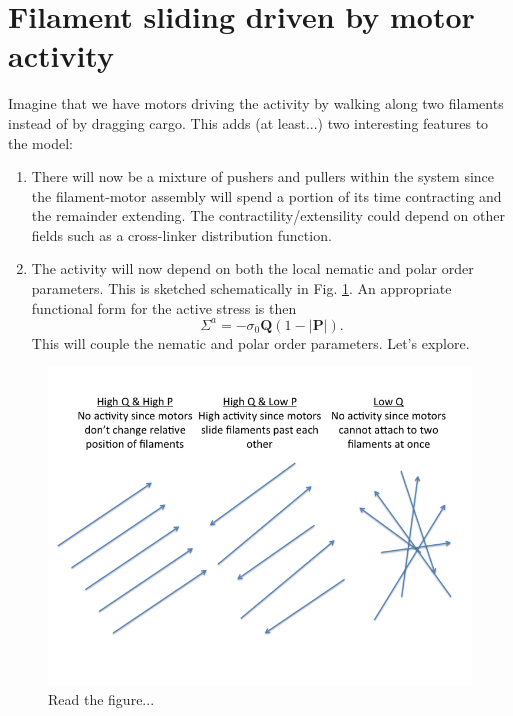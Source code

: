 \documentclass[onecolumn,showpacs,preprintnumbers,prl,amsmath,amssymb]{revtex4-1}
\def\b{\mathbf}
\begin{document}
\section{Filament sliding driven by motor activity}
Imagine that we have motors driving the activity by walking along two filaments instead of by dragging cargo.  This adds (at least...) two interesting features to the model:
\begin{enumerate}
	\item There will now be a mixture of pushers and pullers within the system since the filament-motor assembly will spend a portion of its time contracting and the remainder extending. The contractility/extensility could depend on other fields such as a cross-linker distribution function.
	\item The activity will now depend on both the local nematic and polar order parameters.   This is sketched schematically in Fig. \ref{fig:activity_dependence}.  An appropriate functional form for the active stress is then 
	\begin{equation}
	\Sigma^a=-\sigma_0\b{Q}(1-|{\b{P}}|).
	\end{equation}
	This will couple the nematic and polar order parameters.  Let's explore.
\end{enumerate}
\begin{figure}
\includegraphics[width=.75\textwidth] {activity_dependence_on_QP.png}
\caption{\label{fig:activity_dependence} Read the figure...}
\end{figure}
\end{document}
